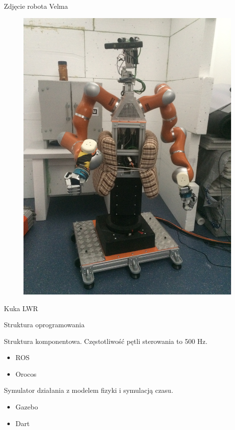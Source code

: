 \documentclass{beamer}
\begin{document}
\begin{frame}{Zdjęcie robota Velma}
\begin{figure}[h]
	\centering
	\includegraphics[scale=0.06, angle =-90]{velma1}
\end{figure}

\end{frame}

\begin{frame}{Kuka LWR}
\end{frame}

\begin{frame}{Struktura oprogramowania}

Struktura komponentowa. Częstotliwość pętli sterowania to 500 Hz.

\begin{itemize}
	\item ROS
	\item Orocos
\end{itemize}

Symulator działania z modelem fizyki i symulacją czasu.


\begin{itemize}
	\item Gazebo
	\item Dart
\end{itemize}
\end{frame}
\end{document}
